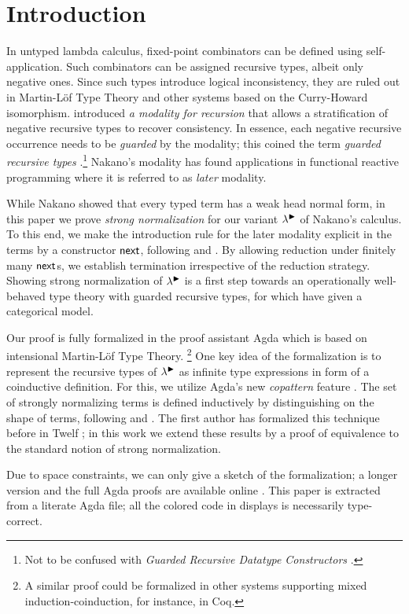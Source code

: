 
\section{Introduction}
\label{sec:intro}

In untyped lambda calculus, fixed-point combinators can be defined
using self-app\-li\-ca\-tion.  Such combinators can be assigned recursive
types, albeit only negative ones.  Since such types introduce logical
inconsistency, they are ruled out in Martin-L\"of
Type Theory and other systems based on the Curry-Howard isomorphism.
\citet{nakano:lics00} introduced \emph{a modality for recursion} that
allows a stratification of negative recursive types to recover
consistency.  In essence, each negative recursive occurrence needs to
be \emph{guarded} by the modality; this coined the term \emph{guarded
  recursive types} \citep{birkedalMogelberg:lics13}.\footnote{Not to
  be confused with \emph{Guarded Recursive Datatype Constructors}
  \citep{xiChenChen:popl03}.}
Nakano's modality has found applications in functional reactive
programming \citep{krishnaswamiBenton:lics11} where it is referred to
as \emph{later} modality.

While Nakano showed that every typed term has a weak head normal form,
in this paper we prove \emph{strong normalization} for our variant
$\lambda^{\mathord{\blacktriangleright}}$ of Nakano's calculus.
To this end, we
make the introduction rule for the later modality explicit in the
terms by a constructor $\mathsf{next}$, following
\citet{birkedalMogelberg:lics13} and \citet{atkeyMcBride:icfp13}.  By
allowing reduction under finitely many $\mathsf{next}$s, we establish
termination irrespective of the reduction strategy.
%
Showing strong normalization of $\lambda^{\mathord{\blacktriangleright}}$ is a first step towards
an operationally well-behaved type theory with guarded recursive types, for
which \citet{birkedalMogelberg:lics13} have given a categorical model.

Our proof is fully formalized in the proof assistant Agda
\citeyearpar{agda24} which is based on intensional Martin-L\"of Type
Theory. \footnote{A similar proof could be formalized in other systems
  supporting mixed induction-coinduction, for instance, in Coq.}
One key idea of the formalization is to represent the recursive types
of $\lambda^{\mathord{\blacktriangleright}}$ as infinite type expressions in form of a
coinductive definition.  For this, we utilize Agda's new
\emph{copattern} feature \citep{abelPientkaThibodeauSetzer:popl13}.
The set of strongly normalizing terms is defined inductively by
distinguishing on the shape of terms, following
\citet{raamsdonk:perpetualReductions} and \citet{matthes:shortproofs}.  The first author has
formalized this technique before in Twelf \citep{abel:entcs04};
in this work we extend these results by a
proof of equivalence to the standard notion of strong normalization.

Due to space constraints, we can only give a sketch of the
formalization; a longer version and
the full Agda proofs
are available online
\citep{abelVezzosi:guardedNormalization}.
This paper is extracted from a literate Agda file; all the colored
code in displays is necessarily type-correct.

